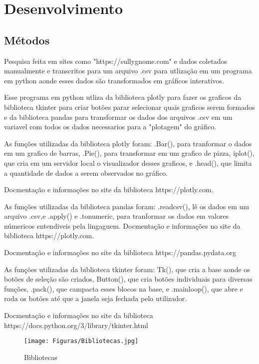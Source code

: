 \chapter{Desenvolvimento} \label{desenvolvimento}
\section{Métodos}
Pesquisa feita em sites como "https://sullygnome.com" e dados coletados manualmente e transcritos para um arquivo .csv para utlização em um programa em python aonde esses dados são transformados em gráficos interativos.

Esse programa em python utliza da biblioteca plotly para fazer os graficos da biblioteca  
tkinter para criar botões parar selecionar quais graficos serem formados e da biblioteca pandas para transformar os dados dos arquivos .csv em um variavel com todos os dados necessarios para a "plotagem" do gráfico.

As funções utilizadas da biblioteca plotly foram: .Bar(), para tranformar o dados em um grafico de barras, .Pie(), para transformar em um grafico de pizza, iplot(), que cria em um servidor local o visualizador desses graficos, e .head(), que limita a quantidade de dados a serem observados no gráfico. 

Docmentação e informações no site da biblioteca https://plotly.com.

As funções utilizadas da biblioteca pandas foram: .read\textunderscore csv(), lê os dados em um arquivo .csv,e .apply() e .to\textunderscore numeric, para tranformar os dados em valores númericos entendiveis pela lingaguem. Docmentação e informações no site da biblioteca https://plotly.com. 

Docmentação e informações no site da biblioteca https://pandas.pydata.org

As funções utilizadas da biblioteca tkinter foram: Tk(), que cria a base aonde os botões de seleção são criados, Button(), que cria botões individuais para diversas funções, .pack(), que campacta esses blocos na base, e .mainloop(), que abre e roda os botões até que a janela seja fechada pelo utilizador. 

Docmentação e informações no site da biblioteca https://docs.python.org/3/library/tkinter.html

\usepackage{graphicx}
\usepackage[portuguese]{babel} %
\date{} %
 
\begin{figure}[h]
\caption{Bibliotecas}
 
\centering %
\texttt{[image: Figuras/Bibliotecas.jpg]} %
\label{figura:qualquernome}
\end{figure}
 
